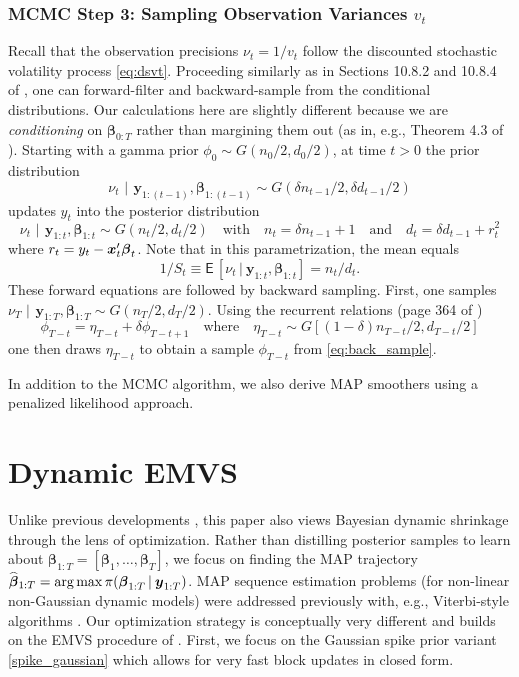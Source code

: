 \documentclass[ba]{imsart}
\numberwithin{equation}{section}
\theoremstyle{plain}
\def\x{\mbox{\boldmath$x$}}
\def\y{\mbox{\boldmath$y$}}
\def\b{\mbox{\boldmath$b$}}
\newcommand{\bm}[1]{\boldsymbol{#1}}
\newcommand{\E}{\mathsf{E\,}}
\newcommand{\wh}[1]{\smash{\widehat{#1}}}
\def\C {\,|\:}
\def\C {\,|\:}
\def\y{\bm{y}}
\def\b{\bm{\beta}}
\begin{document}
{{{\subsubsection{MCMC  Step 3: Sampling Observation Variances $v_t$} 
Recall that the observation precisions $\nu_t=1/v_t$ follow the discounted stochastic volatility process \eqref{eq:dsvt}. Proceeding similarly as in Sections 10.8.2 and 10.8.4 of \cite{WestHarrison1997book2}, one can forward-filter and backward-sample from the conditional distributions. Our calculations here are slightly different because we are {\em conditioning} on $\b_{0:T}$ rather than margining them out (as in, e.g.,  Theorem 4.3 of \cite{WestHarrison1997book2}). Starting with a gamma prior $\phi_0\sim G(n_0/2,d_0/2)$, at time $t>0$ the prior distribution
$$
\nu_t\,\C\, \y_{1:(t-1)},\b_{1:(t-1)}\sim G(\delta n_{t-1}/2,\delta d_{t-1}/2)
$$
updates $y_t$ into the posterior distribution 
\begin{equation}\label{eq:recurrent_variance}
\nu_t\,\C\, \y_{1:t},\b_{1:t}\sim G( n_{t}/2,  d_{t}/2)\quad\text{with}\quad n_t=\delta n_{t-1}+1\quad\text{and}\quad d_t=\delta d_{t-1}+r_t^2
\end{equation}
where $r_t=y_t-\x_t'\b_t$. Note that  in this parametrization, the mean equals
\begin{equation}\label{eq:mean}
1/S_{t}\equiv \E [\nu_t\C  \y_{1:t},\b_{1:t}] =n_{t}/d_{t}.
\end{equation}
These  forward  equations are followed by backward sampling. First, one samples $\nu_T\,\C\,  \y_{1:T},\b_{1:T} \sim G( n_{T}/2,  d_{T}/2)$.
Using the recurrent relations (page 364 of \cite{WestHarrison1997book2})
\begin{equation}\label{eq:back_sample}
\phi_{T-t}=\eta_{T-t}+\delta \phi_{T-t+1}\quad\text{where}\quad \eta_{T-t}\sim G[(1-\delta)n_{T-t}/2, d_{T-t}/2]
\end{equation}
one then draws $\eta_{T-t}$ to obtain a sample $\phi_{T-t}$ from \eqref{eq:back_sample}.
}

In addition to the MCMC algorithm, we also derive MAP smoothers using a penalized likelihood approach.


\section{Dynamic EMVS}\label{sec:dynamic_EMVS}
Unlike previous developments \citep{nakajima_west,kalli_griffin}, this paper also views  Bayesian dynamic shrinkage  through the lens of optimization. Rather than distilling posterior samples  to learn about $\b_{1:T}=[\b_1,\dots,\b_T]$,  we focus  on finding the MAP trajectory $\wh{\b}_{1:T}=\arg\max\pi(\b_{1:T}\C\y_{1:T})$.  MAP sequence estimation problems  (for non-linear non-Gaussian dynamic models)  were addressed previously with,  e.g., Viterbi-style algorithms \citep{godsill}. 
Our optimization strategy is conceptually very different and builds on the  EMVS procedure of \cite{RG14}.  First, we focus on the Gaussian spike prior variant \eqref{spike_gaussian} which allows for very fast block updates in closed form.

}}
\end{document}
